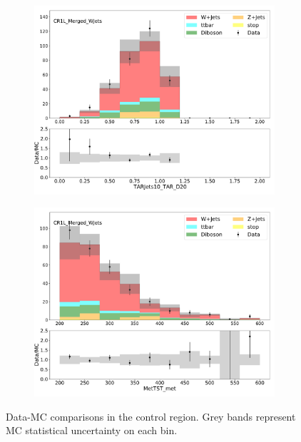 \begin{figure}[htbp]
  \centering
     \begin{subfigure}{0.49\textwidth}
     \includegraphics[width = 0.98\textwidth]{Figures/4/datamc/CR1L_Merged_WJets/TARJets10_TAR_D20.pdf}
     \caption{\DtwoTAR}
     \end{subfigure}
     \begin{subfigure}{0.49\textwidth}
     \includegraphics[width = 0.98\textwidth]{Figures/4/datamc/CR1L_Merged_WJets/MetTST_met.pdf}
     \caption{\met}
     \end{subfigure}

     \caption{Data-MC comparisons in the \merged \wjets control region. Grey bands represent MC statistical uncertainty on each bin.}
     \label{fig:Data_MC_CRdR_merged}
  \end{figure}

